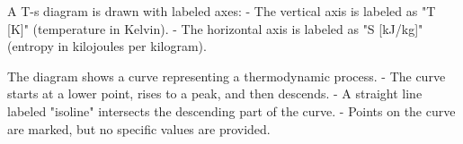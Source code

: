 A T-s diagram is drawn with labeled axes:  
- The vertical axis is labeled as "T [K]" (temperature in Kelvin).  
- The horizontal axis is labeled as "S [kJ/kg]" (entropy in kilojoules per kilogram).  

The diagram shows a curve representing a thermodynamic process.  
- The curve starts at a lower point, rises to a peak, and then descends.  
- A straight line labeled "isoline" intersects the descending part of the curve.  
- Points on the curve are marked, but no specific values are provided.